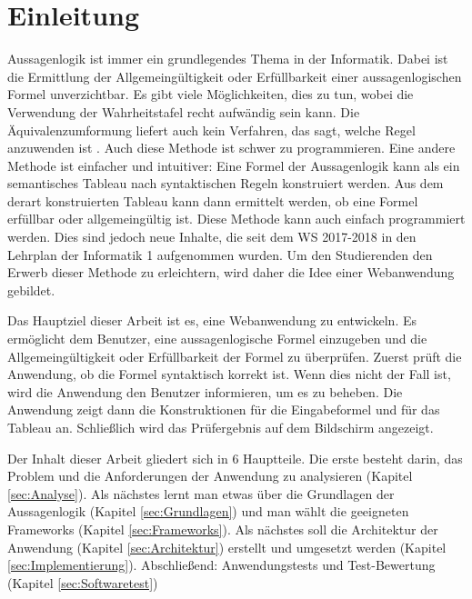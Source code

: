 \chapter{Einleitung}
Aussagenlogik ist immer ein grundlegendes Thema in der Informatik. Dabei ist die Ermittlung der Allgemeingültigkeit oder Erfüllbarkeit einer aussagenlogischen Formel unverzichtbar. Es gibt viele Möglichkeiten, dies zu tun, wobei die Verwendung der Wahrheitstafel recht aufwändig sein kann. Die Äquivalenzumformung liefert auch kein Verfahren, das sagt, welche Regel anzuwenden ist \cite{Schaefer}.
Auch diese Methode ist schwer zu programmieren. Eine andere Methode ist einfacher und intuitiver:  Eine Formel der Aussagenlogik kann als ein semantisches Tableau nach syntaktischen Regeln konstruiert werden. Aus dem derart konstruierten Tableau kann dann ermittelt werden, ob eine Formel erfüllbar oder allgemeingültig ist. Diese Methode kann auch einfach programmiert werden. Dies sind jedoch neue Inhalte, die seit dem WS 2017-2018 in den Lehrplan der Informatik 1 aufgenommen wurden. Um den Studierenden den Erwerb dieser Methode zu erleichtern, wird daher die Idee einer Webanwendung gebildet.

Das Hauptziel dieser Arbeit ist es, eine Webanwendung zu entwickeln. Es ermöglicht dem Benutzer, eine aussagenlogische Formel einzugeben und die Allgemeingültigkeit oder Erfüllbarkeit der Formel zu überprüfen. Zuerst prüft die Anwendung, ob die Formel syntaktisch korrekt ist. Wenn dies nicht der Fall ist, wird die Anwendung den Benutzer informieren, um es zu beheben. Die Anwendung zeigt dann die Konstruktionen für die Eingabeformel und für das Tableau an. Schließlich wird das Prüfergebnis auf dem Bildschirm angezeigt.

Der Inhalt dieser Arbeit gliedert sich in 6 Hauptteile. Die erste besteht darin, das Problem und die Anforderungen der Anwendung zu analysieren (Kapitel \ref{sec:Analyse}). Als nächstes lernt man etwas über die Grundlagen der Aussagenlogik (Kapitel \ref{sec:Grundlagen}) und man wählt die geeigneten Frameworks (Kapitel \ref{sec:Frameworks}). Als nächstes soll die Architektur der Anwendung (Kapitel \ref{sec:Architektur}) erstellt und umgesetzt werden (Kapitel \ref{sec:Implementierung}). Abschließend: Anwendungstests und Test-Bewertung (Kapitel \ref{sec:Softwaretest})

\cleardoublepage
